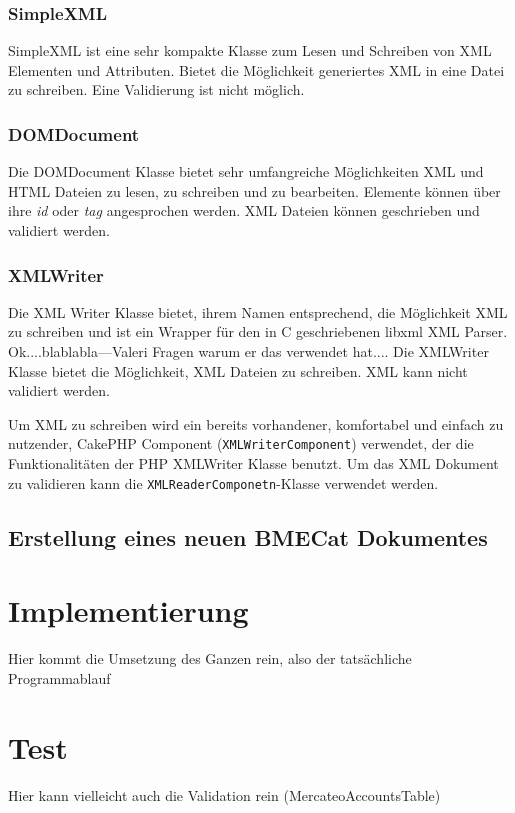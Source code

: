 	\subsubsection{SimpleXML}
	
	SimpleXML ist eine sehr kompakte Klasse zum Lesen und Schreiben von XML Elementen und Attributen. Bietet die Möglichkeit generiertes XML in eine Datei zu schreiben.
	Eine Validierung ist nicht möglich.
	
	\subsubsection{DOMDocument}

	Die DOMDocument Klasse bietet sehr umfangreiche Möglichkeiten XML und HTML Dateien zu lesen, zu schreiben und zu bearbeiten. Elemente können über ihre \textit{id} oder \textit{tag} angesprochen werden. XML Dateien können geschrieben und validiert werden.
	
	\subsubsection{XMLWriter}
	Die XML Writer Klasse bietet, ihrem Namen entsprechend, die Möglichkeit XML zu schreiben und ist ein Wrapper für den in C geschriebenen libxml XML Parser.
	Ok....blablabla---Valeri Fragen warum er das verwendet hat....
	Die XMLWriter Klasse bietet die Möglichkeit, XML Dateien zu schreiben. XML kann nicht validiert werden.
	
	Um XML zu schreiben wird ein bereits vorhandener, komfortabel und einfach zu nutzender, CakePHP Component (\texttt{XMLWriterComponent}) verwendet, der die Funktionalitäten der PHP XMLWriter Klasse benutzt. Um das XML Dokument zu validieren kann die \texttt{XMLReaderComponetn}-Klasse verwendet werden.
	
	\subsection{Erstellung eines neuen BMECat Dokumentes}
	
	\section{Implementierung}
	
	Hier kommt die Umsetzung des Ganzen rein, also der tatsächliche Programmablauf
	
	\section{Test}

	Hier kann vielleicht auch die Validation rein (MercateoAccountsTable)
	

